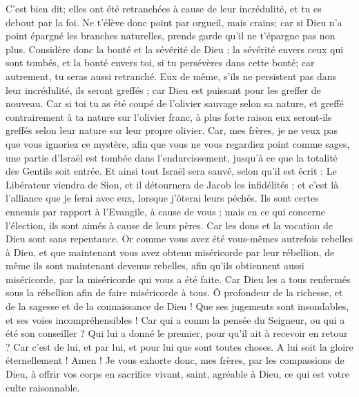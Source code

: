 \begin{multicols}{2}
C'est bien dit; elles ont été retranchées à cause de leur incrédulité, et tu es debout par la foi. Ne t'élève donc point par orgueil, mais crains;
car si Dieu n'a point épargné les branches naturelles, prends garde qu'il ne t'épargne pas non plus.
Considère donc la bonté et la sévérité de Dieu ; la sévérité envers ceux qui sont tombés, et la bonté envers toi, si tu persévères dans cette bonté; car autrement, tu seras aussi retranché.
Eux de même, s'ils ne persistent pas dans leur incrédulité, ils seront greffés ; car Dieu est puissant pour les greffer de nouveau.
Car si toi tu as été coupé de l'olivier sauvage selon sa nature, et greffé contrairement à ta nature sur l'olivier franc, à plus forte raison eux seront-ils greffés selon leur nature sur leur propre olivier.
Car, mes frères, je ne veux pas que vous ignoriez ce mystère, afin que vous ne vous regardiez point comme sages, une partie d'Israël est tombée dans l'endurcissement, jusqu'à ce que la totalité des Gentils soit entrée.
Et ainsi tout Israël sera sauvé, selon qu'il est écrit : Le Libérateur viendra de Sion, et il détournera de Jacob les infidélités ;
et c'est là l'alliance que je ferai avec eux, lorsque j'ôterai leurs péchés.
Ils sont certes ennemis par rapport à l'Evangile, à cause de vous ; mais en ce qui concerne l'élection, ils sont aimés à cause de leurs pères.
Car les dons et la vocation de Dieu sont sans repentance.
Or comme vous avez été vous-mêmes autrefois rebelles à Dieu, et que maintenant vous avez obtenu miséricorde par leur rébellion,
de même ils sont maintenant devenus rebelles, afin qu'ils obtiennent aussi miséricorde, par la miséricorde qui vous a été faite.
Car Dieu les a tous renfermés sous la rébellion afin de faire miséricorde à tous.
Ô profondeur de la richesse, et de la sagesse et de la connaissance de Dieu ! Que ses jugements sont insondables, et ses voies incompréhensibles !
Car qui a connu la pensée du Seigneur, ou qui a été son conseiller ?
Qui lui a donné le premier, pour qu'il ait à recevoir en retour ?
Car c'est de lui, et par lui, et pour lui que sont toutes choses. A lui soit la gloire éternellement ! Amen !
\VerseOne{}Je vous exhorte donc, mes frères, par les compassions de Dieu, à offrir vos corps en sacrifice vivant, saint, agréable à Dieu, ce qui est votre culte raisonnable.

\end{multicols}
